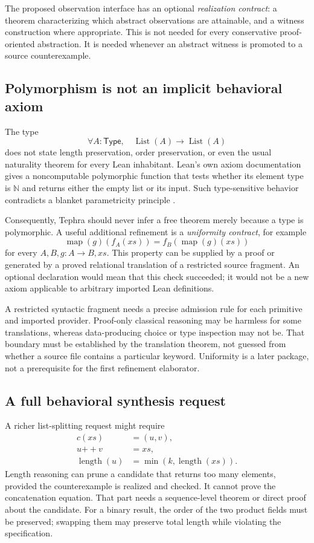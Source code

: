\documentclass[11pt,a4paper]{article}
\newcommand{\code}[1]{\texttt{\detokenize{#1}}}
\newcommand{\N}{\mathbb N}
\newcommand{\Type}{\mathsf{Type}}
\theoremstyle{plain}
\theoremstyle{definition}
\begin{document}
The proposed observation interface has an optional \emph{realization contract}: a theorem characterizing which abstract observations are attainable, and a witness construction where appropriate. This is not needed for every conservative proof-oriented abstraction. It is needed whenever an abstract witness is promoted to a source counterexample.

\subsection{Polymorphism is not an implicit behavioral axiom}
The type
\[
 \forall A:\Type,\quad \operatorname{List}(A)\to\operatorname{List}(A)
\]
does not state length preservation, order preservation, or even the usual naturality theorem for every Lean inhabitant. Lean's own axiom documentation gives a noncomputable polymorphic function that tests whether its element type is $\N$ and returns either the empty list or its input. Such type-sensitive behavior contradicts a blanket parametricity principle \cite{lean-axioms}.

Consequently, Tephra should never infer a free theorem merely because a type is polymorphic. A useful additional refinement is a \emph{uniformity contract}, for example
\[
 \operatorname{map}(g)(f_A(xs))
     =f_B(\operatorname{map}(g)(xs))
\]
for every $A,B,g:A\to B,xs$. This property can be supplied by a proof or generated by a proved relational translation of a restricted source fragment. An optional \code{uniform} declaration would mean that this check succeeded; it would not be a new axiom applicable to arbitrary imported Lean definitions.

A restricted syntactic fragment needs a precise admission rule for each primitive and imported provider. Proof-only classical reasoning may be harmless for some translations, whereas data-producing choice or type inspection may not be. That boundary must be established by the translation theorem, not guessed from whether a source file contains a particular keyword. Uniformity is a later package, not a prerequisite for the first refinement elaborator.

\subsection{A full behavioral synthesis request}
A richer list-splitting request might require
\[
 \begin{split}
 c(xs)&=(u,v),\\
 u\mathbin{+\!+}v&=xs,\\
 \operatorname{length}(u)&=\min(k,\operatorname{length}(xs)).
 \end{split}
\]
Length reasoning can prune a candidate that returns too many elements, provided the counterexample is realized and checked. It cannot prove the concatenation equation. That part needs a sequence-level theorem or direct proof about the candidate. For a binary result, the order of the two product fields must be preserved; swapping them may preserve total length while violating the specification.
\end{document}
